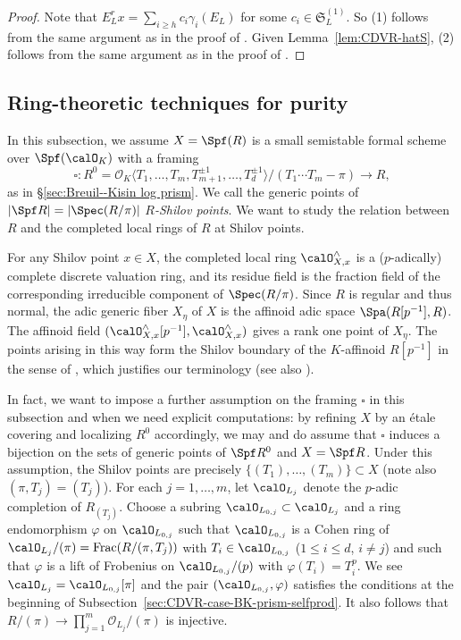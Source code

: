 \begin{proof}
Note that $E_L^r x = \sum_{i \geq h} c_i\gamma_i(E_L)$ for some $c_i \in \mathfrak{S}_L^{(1)}$. So (1) follows from the same argument as in the proof of \cite[Lem.~4.4]{du-liu-moon-shimizu-completed-prismatic-F-crystal-loc-system}. Given Lemma~\ref{lem:CDVR-hatS}, (2) follows from the same argument as in the proof of \cite[Lem.~4.8]{du-liu-moon-shimizu-completed-prismatic-F-crystal-loc-system}.   
\end{proof}



\subsection{Ring-theoretic techniques for purity} \label{sec:prelim-facts-rings}

In this subsection, we assume $X=\Spf(R)$ is a small semistable formal scheme over $\Spf(\calO_K)$ with a framing 
\[
\square\colon R^{0} = \mathcal{O}_K \langle T_1, \ldots, T_m, T_{m+1}^{\pm 1}, \ldots, T_d^{\pm 1}\rangle / (T_1\cdots T_m - \pi) \rightarrow R,
\]
as in \S\ref{sec:Breuil--Kisin log prism}. We call the generic points of $\lvert \Spf R\rvert=\lvert \Spec (R/\pi)\rvert$ \emph{$R$-Shilov points}. We want to study the relation between $R$ and the completed local rings of $R$ at Shilov points. 

For any Shilov point $x\in X$, the completed local ring $\calO_{X,x}^\wedge$ is a ($p$-adically) complete discrete valuation ring, and its residue field is the fraction field of the corresponding irreducible component of $\Spec (R/\pi)$. Since $R$ is regular and thus normal, the adic generic fiber $X_\eta$ of $X$ is the affinoid adic space $\Spa(R[p^{-1}], R)$. The affinoid field $(\calO_{X,x}^\wedge[p^{-1}],\calO_{X,x}^\wedge)$ gives a rank one point of $X_\eta$. The points arising in this way form the Shilov boundary of the $K$-affinoid $R[p^{-1}]$ in the sense of \cite[p.~36]{Berkovich}, which justifies our terminology (see also \cite[Def.~2.4]{bhatt_hansen-6-functor-rigid}).

In fact, we want to impose a further assumption on the framing $\square$ in this subsection and when we need explicit computations: by refining $X$ by an \'etale covering and localizing $R^0$ accordingly, we may and do assume that $\square$ induces a bijection on the sets of generic points of $\Spf R^0$ and $X=\Spf R$. Under this assumption, the Shilov points are precisely $\{(T_1),\ldots, (T_m)\}\subset X$ (note also $(\pi,T_j)=(T_j)$). For each $j = 1, \ldots, m$, let $\calO_{L_j}$ denote the $p$-adic completion of $R_{(T_j)}$. Choose a subring $\calO_{L_{0,j}}\subset \calO_{L_j}$ and a ring endomorphism $\varphi$ on $\calO_{L_{0,j}}$ such that $\calO_{L_{0,j}}$ is a Cohen ring of $\calO_{L_j}/(\pi)=\operatorname{Frac}(R/(\pi, T_j))$ with $T_i\in \calO_{L_{0,j}}$ ($1\leq i \leq d$, $i\neq j$) and such that $\varphi$ is a lift of Frobenius on $\calO_{L_{0,j}}/(p)$ with $\varphi(T_i)=T_i^p$. We see $\calO_{L_j}=\calO_{L_{0,j}}[\pi]$ and the pair $(\calO_{L_{0,j}},\varphi)$ satisfies the conditions at the beginning of Subsection~\ref{sec:CDVR-case-BK-prism-selfprod}.
It also follows that $R/(\pi) \rightarrow \prod_{j=1}^m \mathcal{O}_{L_j}/(\pi)$ is injective.

